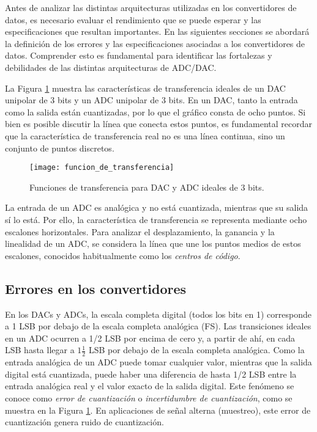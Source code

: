     Antes de analizar las distintas arquitecturas utilizadas en los convertidores de datos, es necesario evaluar el rendimiento que se puede esperar y las especificaciones que resultan importantes. En las siguientes secciones se abordará la definición de los errores y las especificaciones asociadas a los convertidores de datos. Comprender esto es fundamental para identificar las fortalezas y debilidades de las distintas arquitecturas de ADC/DAC.

    La Figura \ref{fig:funcion_de_transferencia} muestra las características de transferencia ideales de un DAC unipolar de 3 bits y un ADC unipolar de 3 bits. En un DAC, tanto la entrada como la salida están cuantizadas, por lo que el gráfico consta de ocho puntos. Si bien es posible discutir la línea que conecta estos puntos, es fundamental recordar que la característica de transferencia real no es una línea continua, sino un conjunto de puntos discretos.

    \begin{figure}[!h]
      \centering
      \texttt{[image: funcion\_de\_transferencia]}
      \caption{Funciones de transferencia para DAC y ADC ideales de 3 bits.}
      \label{fig:funcion_de_transferencia}
    \end{figure}

    La entrada de un ADC es analógica y no está cuantizada, mientras que su salida sí lo está. Por ello, la característica de transferencia se representa mediante ocho escalones horizontales. Para analizar el desplazamiento, la ganancia y la linealidad de un ADC, se considera la línea que une los puntos medios de estos escalones, conocidos habitualmente como los \textit{centros de código}.

    \subsection{Errores en los convertidores}

    En los DACs y ADCs, la escala completa digital (todos los bits en 1) corresponde a 1 LSB por debajo de la escala completa analógica (FS). Las transiciones ideales en un ADC ocurren a 1/2 LSB por encima de cero y, a partir de ahí, en cada LSB hasta llegar a $1 \frac{1}{2}$ LSB por debajo de la escala completa analógica. Como la entrada analógica de un ADC puede tomar cualquier valor, mientras que la salida digital está cuantizada, puede haber una diferencia de hasta 1/2 LSB entre la entrada analógica real y el valor exacto de la salida digital. Este fenómeno se conoce como \textit{error de cuantización} o \textit{incertidumbre de cuantización}, como se muestra en la Figura \ref{fig:funcion_de_transferencia}. En aplicaciones de señal alterna (muestreo), este error de cuantización genera ruido de cuantización.


